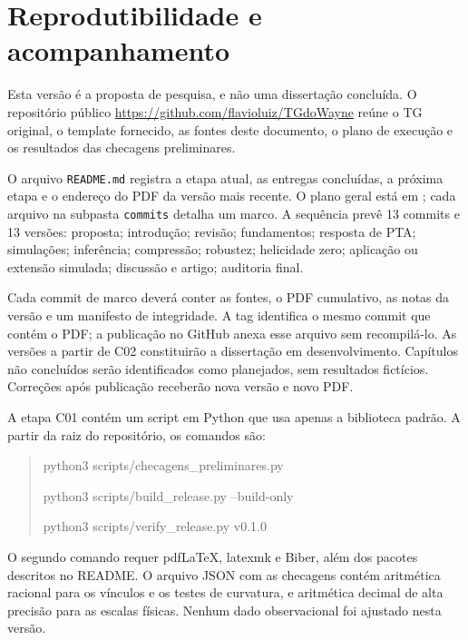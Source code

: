 \chapter{Reprodutibilidade e acompanhamento}
Esta versão é a proposta de pesquisa, e não uma dissertação concluída.
O repositório público \url{https://github.com/flavioluiz/TGdoWayne} reúne o TG
original, o template fornecido, as fontes deste documento, o plano de execução
e os resultados das checagens preliminares.

O arquivo \texttt{README.md} registra a etapa atual, as entregas concluídas,
a próxima etapa e o endereço do PDF da versão mais recente. O plano geral
está em ; cada arquivo na subpasta
\texttt{commits} detalha um marco. A sequência prevê 13 commits e 13 versões:
proposta; introdução; revisão; fundamentos; resposta de PTA; simulações;
inferência; compressão; robustez; helicidade zero; aplicação ou extensão
simulada; discussão e artigo; auditoria final.

Cada commit de marco deverá conter as fontes, o PDF cumulativo, as notas da
versão e um manifesto de integridade. A tag identifica o mesmo commit que
contém o PDF; a publicação no GitHub anexa esse arquivo sem recompilá-lo.
As versões a partir de C02 constituirão a dissertação em desenvolvimento.
Capítulos não concluídos serão identificados como planejados, sem resultados
fictícios. Correções após publicação receberão nova versão e novo PDF.

A etapa C01 contém um script em Python que usa apenas a biblioteca padrão.
A partir da raiz do repositório, os comandos são:
\begin{quote}\small\ttfamily
python3 scripts/checagens\_preliminares.py\par
python3 scripts/build\_release.py --build-only\par
python3 scripts/verify\_release.py v0.1.0
\end{quote}
O segundo comando requer pdfLaTeX, latexmk e Biber, além dos pacotes descritos
no README. O arquivo JSON com as checagens contém aritmética racional para os
vínculos e os testes de curvatura, e aritmética decimal de alta precisão para
as escalas físicas. Nenhum dado observacional foi ajustado nesta versão.

